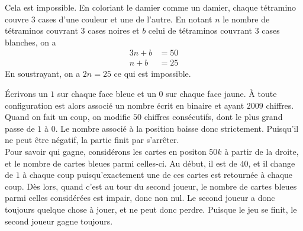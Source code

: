 \begin{sol}
Cela est impossible. En coloriant le damier comme un damier, chaque tétramino couvre $3$ cases d'une couleur et une de l'autre. En notant $n$ le nombre de tétraminos couvrant $3$ cases noires et $b$ celui de tétraminos couvrant $3$ cases blanches, on a
\begin{align*}
3n+b&=50\\
n+b&=25
\end{align*}
En soustrayant, on a $2n=25$ ce qui est impossible.
\end{sol}

\begin{sol}
Écrivons un $1$ sur chaque face bleue et un $0$ sur chaque face jaune. À toute configuration est alors associé un nombre écrit en binaire et ayant $2009$ chiffres. Quand on fait un coup, on modifie $50$ chiffres consécutifs, dont le plus grand passe de $1$ à $0$. Le nombre associé à la position baisse donc strictement. Puisqu'il ne peut être négatif, la partie finit par s'arrêter.\\
Pour savoir qui gagne, considérons les cartes en positon $50k$ à partir de la droite, et le nombre de cartes bleues parmi celles-ci. Au début, il est de $40$, et il change de $1$ à chaque coup puisqu'exactement une de ces cartes est retournée à chaque coup. Dès lors, quand c'est au tour du second joueur, le nombre de cartes bleues parmi celles considérées est impair, donc non nul. Le second joueur a donc toujours quelque chose à jouer, et ne peut donc perdre. Puisque le jeu se finit, le second joueur gagne toujours.
\end{sol}

